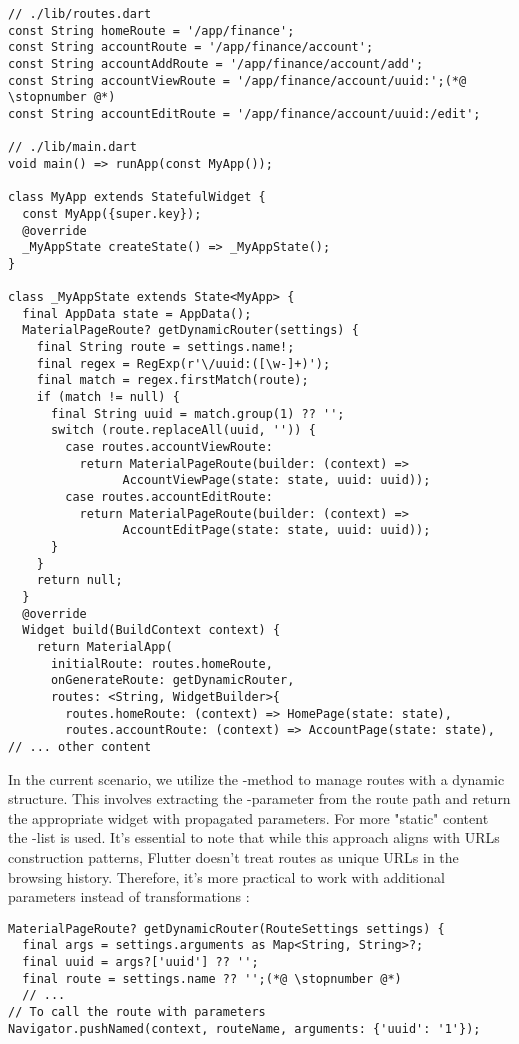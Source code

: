 \begin{lstlisting}
// ./lib/routes.dart
const String homeRoute = '/app/finance';
const String accountRoute = '/app/finance/account';
const String accountAddRoute = '/app/finance/account/add';
const String accountViewRoute = '/app/finance/account/uuid:';(*@ \stopnumber @*)
const String accountEditRoute = '/app/finance/account/uuid:/edit';

// ./lib/main.dart
void main() => runApp(const MyApp());

class MyApp extends StatefulWidget {
  const MyApp({super.key});
  @override
  _MyAppState createState() => _MyAppState();
}

class _MyAppState extends State<MyApp> {
  final AppData state = AppData();
  MaterialPageRoute? getDynamicRouter(settings) {
    final String route = settings.name!;
    final regex = RegExp(r'\/uuid:([\w-]+)');
    final match = regex.firstMatch(route);
    if (match != null) {
      final String uuid = match.group(1) ?? '';
      switch (route.replaceAll(uuid, '')) {
        case routes.accountViewRoute:
          return MaterialPageRoute(builder: (context) => 
                AccountViewPage(state: state, uuid: uuid));
        case routes.accountEditRoute:
          return MaterialPageRoute(builder: (context) => 
                AccountEditPage(state: state, uuid: uuid));
      }
    }
    return null;
  }
  @override
  Widget build(BuildContext context) {
    return MaterialApp(
      initialRoute: routes.homeRoute,
      onGenerateRoute: getDynamicRouter,
      routes: <String, WidgetBuilder>{
        routes.homeRoute: (context) => HomePage(state: state),
        routes.accountRoute: (context) => AccountPage(state: state),
// ... other content
\end{lstlisting}

\noindent In the current scenario, we utilize the -method to manage routes with a dynamic structure. 
This involves extracting the -parameter from the route path and return the appropriate widget with propagated 
parameters. For more "static" content the -list is used. It's essential to note that while this approach 
aligns with URLs construction patterns, Flutter doesn't treat routes as unique URLs in the browsing history. Therefore, 
it's more practical to work with additional parameters instead of  transformations :

\begin{lstlisting}
MaterialPageRoute? getDynamicRouter(RouteSettings settings) {
  final args = settings.arguments as Map<String, String>?;
  final uuid = args?['uuid'] ?? '';
  final route = settings.name ?? '';(*@ \stopnumber @*)
  // ...
// To call the route with parameters
Navigator.pushNamed(context, routeName, arguments: {'uuid': '1'});
\end{lstlisting}

